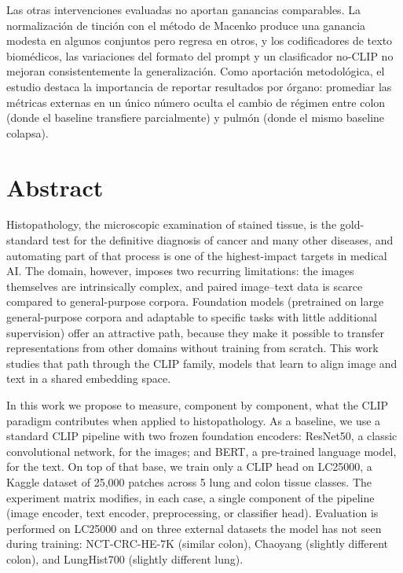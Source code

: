 Las otras intervenciones evaluadas no aportan ganancias comparables. La normalización de tinción con el método de Macenko produce una ganancia modesta en algunos conjuntos pero regresa en otros, y los codificadores de texto biomédicos, las variaciones del formato del prompt y un clasificador no-CLIP no mejoran consistentemente la generalización. Como aportación metodológica, el estudio destaca la importancia de reportar resultados por órgano: promediar las métricas externas en un único número oculta el cambio de régimen entre colon (donde el baseline transfiere parcialmente) y pulmón (donde el mismo baseline colapsa).


\chapter*{Abstract}
\pagestyle{especial}
{}

Histopathology, the microscopic examination of stained tissue, is the gold-standard test for the definitive diagnosis of cancer and many other diseases, and automating part of that process is one of the highest-impact targets in medical AI. The domain, however, imposes two recurring limitations: the images themselves are intrinsically complex, and paired image--text data is scarce compared to general-purpose corpora. Foundation models (pretrained on large general-purpose corpora and adaptable to specific tasks with little additional supervision) offer an attractive path, because they make it possible to transfer representations from other domains without training from scratch. This work studies that path through the CLIP family, models that learn to align image and text in a shared embedding space.

In this work we propose to measure, component by component, what the CLIP paradigm contributes when applied to histopathology. As a baseline, we use a standard CLIP pipeline with two frozen foundation encoders: ResNet50, a classic convolutional network, for the images; and BERT, a pre-trained language model, for the text. On top of that base, we train only a CLIP head on LC25000, a Kaggle dataset of 25,000 patches across 5 lung and colon tissue classes. The experiment matrix modifies, in each case, a single component of the pipeline (image encoder, text encoder, preprocessing, or classifier head). Evaluation is performed on LC25000 and on three external datasets the model has not seen during training: NCT-CRC-HE-7K (similar colon), Chaoyang (slightly different colon), and LungHist700 (slightly different lung).

